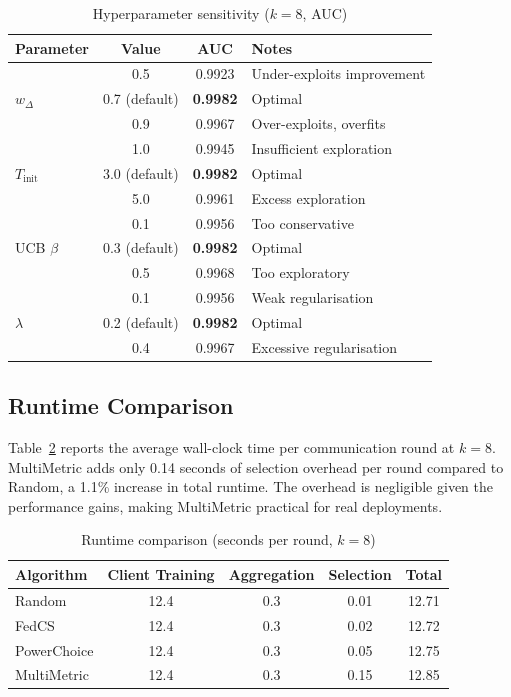 \begin{table}[htbp]
\centering
\caption{Hyperparameter sensitivity ($k=8$, AUC)}
\label{tab:hyperparams_sensitivity}
\begin{tabular}{|l|c|c|l|}
\hline
\textbf{Parameter} & \textbf{Value} & \textbf{AUC} & \textbf{Notes} \\
\hline
\multirow{3}{*}{$w_\Delta$} & 0.5 & 0.9923 & Under-exploits improvement \\
 & 0.7 (default) & \textbf{0.9982} & Optimal \\
 & 0.9 & 0.9967 & Over-exploits, overfits \\
\hline
\multirow{3}{*}{$T_{\text{init}}$} & 1.0 & 0.9945 & Insufficient exploration \\
 & 3.0 (default) & \textbf{0.9982} & Optimal \\
 & 5.0 & 0.9961 & Excess exploration \\
\hline
\multirow{3}{*}{UCB $\beta$} & 0.1 & 0.9956 & Too conservative \\
 & 0.3 (default) & \textbf{0.9982} & Optimal \\
 & 0.5 & 0.9968 & Too exploratory \\
\hline
\multirow{3}{*}{$\lambda$} & 0.1 & 0.9956 & Weak regularisation \\
 & 0.2 (default) & \textbf{0.9982} & Optimal \\
 & 0.4 & 0.9967 & Excessive regularisation \\
\hline
\end{tabular}
\end{table}

\subsection{Runtime Comparison}

Table~\ref{tab:runtime} reports the average wall-clock time per communication round at $k=8$. MultiMetric adds only 0.14 seconds of selection overhead per round compared to Random, a 1.1\% increase in total runtime. The overhead is negligible given the performance gains, making MultiMetric practical for real deployments.

\begin{table}[htbp]
\centering
\caption{Runtime comparison (seconds per round, $k=8$)}
\label{tab:runtime}
\begin{tabular}{|l|c|c|c|c|}
\hline
\textbf{Algorithm} & \textbf{Client Training} & \textbf{Aggregation} & \textbf{Selection} & \textbf{Total} \\
\hline
Random       & 12.4 & 0.3 & 0.01 & 12.71 \\
FedCS        & 12.4 & 0.3 & 0.02 & 12.72 \\
PowerChoice  & 12.4 & 0.3 & 0.05 & 12.75 \\
MultiMetric  & 12.4 & 0.3 & 0.15 & 12.85 \\
\hline
\end{tabular}
\end{table}

